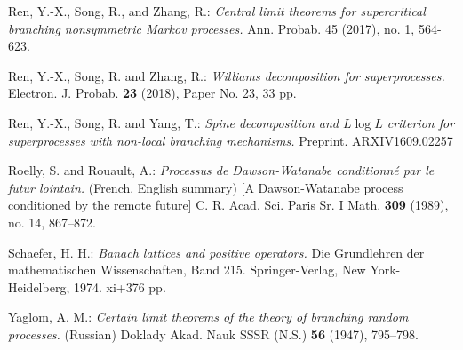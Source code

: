 \documentclass[12pt,a4paper]{amsart}
\numberwithin{equation}{section}
\theoremstyle{plain}
\theoremstyle{definition}
\theoremstyle{remark}
\begin{document}
\begin{thebibliography}{99}
Ren, Y.-X., Song, R., and Zhang, R.:
\emph{Central limit theorems for supercritical branching nonsymmetric Markov processes.}
Ann. Probab. 45 (2017), no. 1, 564-623.

Ren, Y.-X., Song, R. and Zhang, R.:
\emph{Williams decomposition for superprocesses.}
Electron. J. Probab. \textbf{23} (2018), Paper No. 23, 33 pp.

Ren, Y.-X., Song, R. and Yang, T.:
\emph{Spine decomposition and {$ L\log L $} criterion for superprocesses with non-local branching mechanisms.}
Preprint.
ARXIV{1609.02257}

Roelly, S. and Rouault, A.:
\emph{Processus de Dawson-Watanabe conditionn\'e par le futur lointain.} (French. English summary) [A Dawson-Watanabe process conditioned by the remote future]
C. R. Acad. Sci. Paris Sr. I Math. \textbf{309} (1989), no. 14, 867--872.

Schaefer, H. H.:
\emph{Banach lattices and positive operators.}
Die Grundlehren der mathematischen Wissenschaften, Band 215. Springer-Verlag, New York-Heidelberg, 1974. xi+376 pp. 

Yaglom, A. M.:
\emph{Certain limit theorems of the theory of branching random processes.} (Russian)
Doklady Akad. Nauk SSSR (N.S.) \textbf{56} (1947), 795--798.

\end{thebibliography}
\end{document}
